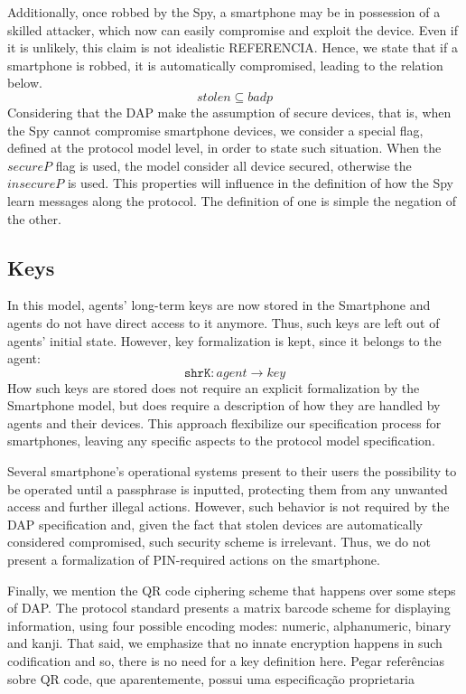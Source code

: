Additionally, once robbed by the Spy, a smartphone may be in possession of a skilled attacker, which now can easily compromise and exploit the device. Even if it is unlikely, this claim is not idealistic {\color{blue} REFERENCIA}. Hence, we state that if a smartphone is robbed, it is automatically compromised, leading to the relation below.
%
$$stolen \subseteq badp$$
%
Considering that the DAP make the assumption of secure devices, that is, when the Spy cannot compromise smartphone devices, we consider a special flag, defined at the protocol model level, in order to state such situation. When the \(secureP\) flag is used, the model consider all device secured, otherwise the \(insecureP\) is used. This properties will influence in the definition of how the Spy learn messages along the protocol. The definition of one is simple the negation of the other.



\subsection{Keys}
In this model, agents' long-term keys are now stored in the Smartphone and agents do not have direct access to it anymore. Thus, such keys are left out of agents' initial state. However, key formalization is kept, since it belongs to the agent:
%
$$\texttt{shrK} : agent \longrightarrow key$$
%
How such keys are stored does not require an explicit formalization by the Smartphone model, but does require a description of how they are handled by agents and their devices. This approach flexibilize our specification process for smartphones, leaving any specific aspects to the protocol model specification.

Several smartphone's operational systems present to their users the possibility to be operated until a passphrase is inputted, protecting them from any unwanted access and further illegal actions. However, such behavior is not required by the DAP specification and, given the fact that stolen devices are automatically considered compromised, such security scheme is irrelevant. Thus, we do not present a formalization of PIN-required actions on the smartphone.

Finally, we mention the QR code ciphering scheme that happens over some steps of DAP. The protocol standard presents a matrix barcode scheme for displaying information, using four possible encoding modes: numeric, alphanumeric, binary and kanji. That said, we emphasize that no innate encryption happens in such codification and so, there is no need for a key definition here. {\color{blue} Pegar referências sobre QR code, que aparentemente, possui uma especificação proprietaria}



